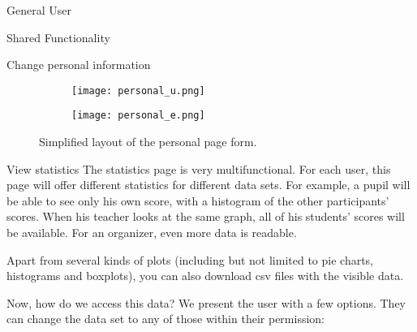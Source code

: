 \begin{section}{General User}
\begin{subsection}{Shared Functionality}
\begin{subsubsection}{Change personal information}
            \begin{figure}[h]
                \centering
                \begin{subfigure}{0.7\textwidth}
                    \texttt{[image: personal\_u.png]}
                    \label{img:personal}
                \end{subfigure}

                \begin{subfigure}{0.7\textwidth}
                    \texttt{[image: personal\_e.png]}
                    \label{img:personal_edit}
                \end{subfigure}
                \caption{Simplified layout of the personal page form.}
            \end{figure}
        \end{subsubsection}

        \begin{subsubsection}{View statistics}
            The statistics page is very multifunctional. For each user, this
            page will offer different statistics for different data sets. For
            example, a pupil will be able to see only his own score, with a
            histogram of the other participants' scores. When his teacher looks
            at the same graph, all of his students' scores will be available.
            For an organizer, even more data is readable.

            Apart from several kinds of plots (including but not limited to pie
            charts, histograms and boxplots), you can also download csv files
            with the visible data.

            Now, how do we access this data? We present the user with a few
            options. They can change the data set to any of those within their
            permission:


\end{subsubsection}
\end{subsection}
\end{section}
